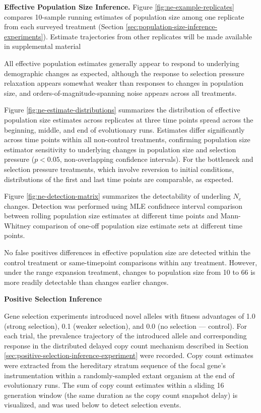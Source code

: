 
\textbf{Effective Population Size Inference.}
Figure \ref{fig:ne-example-replicates} compares 10-sample running estimates of population size among one replicate from each surveyed treatment (Section \ref{sec:population-size-inference-experiments}).
Estimate trajectories from other replicates will be made available in supplemental material

All effective population estimates generally appear to respond to underlying demographic changes as expected, although the response to selection pressure relaxation appears somewhat weaker than responses to changes in population size, and orders-of-magnitude-spanning noise appears across all treatments.



Figure \ref{fig:ne-estimate-distributions} summarizes the distribution of effective population size estimates across replicates at three time points spread across the beginning, middle, and end of evolutionary runs.
Estimates differ significantly across time points within all non-control treatments, confirming population size estimator sensitivity to underlying changes in population size and selection pressure ($p < 0.05$, non-overlapping confidence intervals).
For the bottleneck and selection pressure treatments, which involve reversion to initial conditions, distributions of the first and last time points are comparable, as expected.



Figure \ref{fig:ne-detection-matrix} summarizes the detectability of underling $N_e$ changes.
Detection was performed using MLE confidnece interval comparison between rolling population size estimates at different time points and Mann-Whitney comparison of one-off population size estimate sets at different time points.

No false positives differences in effective population size are detected within the control treatment or same-timepoint comparisons within any treatment.
However, under the range expansion treatment, changes to population size from 10 to 66 is more readily detectable than changes earlier changes.


\textbf{Positive Selection Inference}

Gene selection experiments introduced novel alleles with fitness advantages of 1.0 (strong selection), 0.1 (weaker selection), and 0.0 (no selection --- control).
For each trial, the prevalence trajectory of the introduced allele and corresponding response in the distributed delayed copy count mechanism described in Section \ref{sec:positive-selection-inference-experiment} were recorded.
Copy count estimates were extracted from the hereditary stratum sequence of the focal gene's instrumentation within a randomly-sampled extant organism at the end of evolutionary runs.
The sum of copy count estimates within a sliding 16 generation window (the same duration as the copy count snapshot delay) is visualized, and was used below to detect selection events.

